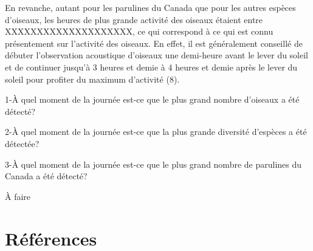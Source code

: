 \documentclass[9pt,twocolumn,twoside,]{pnas-new}
\begin{document}
En revanche, autant pour les parulines du Canada que pour les autres
espèces d'oiseaux, les heures de plus grande activité des oiseaux
étaient entre XXXXXXXXXXXXXXXXXXXX, ce qui correspond à ce qui est connu
présentement sur l'activité des oiseaux. En effet, il est généralement
conseillé de débuter l'observation acoustique d'oiseaux une demi-heure
avant le lever du soleil et de continuer jusqu'à 3 heures et demie à 4
heures et demie après le lever du soleil pour profiter du maximum
d'activité (8).

1-À quel moment de la journée est-ce que le plus grand nombre d'oiseaux
a été détecté?

2-À quel moment de la journée est-ce que la plus grande diversité
d'espèces a été détectée?

3-À quel moment de la journée est-ce que le plus grand nombre de
parulines du Canada a été détecté?

À faire

\hypertarget{ruxe9fuxe9rences}{%
\section*{Références}\label{ruxe9fuxe9rences}}

\showmatmethods
\showacknow
\pnasbreak
\end{document}
